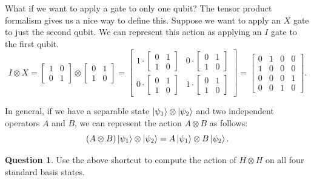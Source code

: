 \documentclass[letterpaper, 12pt]{article}
\newcommand{\1}{\mathds{1}}	%
\theoremstyle{definition}
\newtheorem{question}{Question}
\begin{document}
What if we want to apply a gate to only one qubit? The tensor product formalism gives us a nice way to define this. Suppose we want to apply an $X$ gate to just the second qubit. We can represent this action as applying an $I$ gate to the first qubit. 
\begin{equation}
    I \otimes X = \begin{bmatrix}
        1 & 0 \\
        0 & 1 
    \end{bmatrix} \otimes \begin{bmatrix}
        0 & 1 \\ 
        1 & 0 
    \end{bmatrix} = \begin{bmatrix}
        1 \cdot \begin{bmatrix}
        0 & 1 \\ 
        1 & 0 
    \end{bmatrix} & 0 \cdot \begin{bmatrix}
        0 & 1 \\ 
        1 & 0 
    \end{bmatrix} \\
        0 \cdot \begin{bmatrix}
        0 & 1 \\ 
        1 & 0 
    \end{bmatrix} & 1 \cdot \begin{bmatrix}
        0 & 1 \\ 
        1 & 0 
    \end{bmatrix}
    \end{bmatrix} = \begin{bmatrix}
        0 & 1 & 0 & 0 \\
        1 & 0 & 0 & 0 \\ 
        0 & 0 & 0 & 1 \\ 
        0 & 0 & 1 & 0 
    \end{bmatrix}. 
\end{equation}

In general, if we have a separable state $\ket{\psi_1} \otimes \ket{\psi_2}$ and two independent operators $A$ and $B$, we can represent the action $A \otimes B$ as follows: 
\begin{equation}
    (A \otimes B) \ket{\psi_1} \otimes \ket{\psi_2} = A \ket{\psi_1} \otimes B \ket{\psi_2}.
\end{equation}

\begin{question}
    Use the above shortcut to compute the action of $H \otimes H$ on all four standard basis states. 
\end{question}
\end{document}
